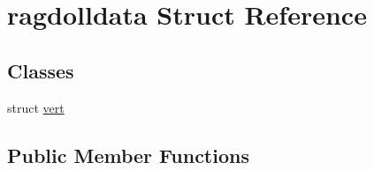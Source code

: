 \hypertarget{structragdolldata}{}\section{ragdolldata Struct Reference}
\label{structragdolldata}
\subsection*{Classes}
\begin{DoxyCompactItemize}
\item 
struct \hyperlink{structragdolldata_1_1vert}{vert}
\end{DoxyCompactItemize}
\subsection*{Public Member Functions}

